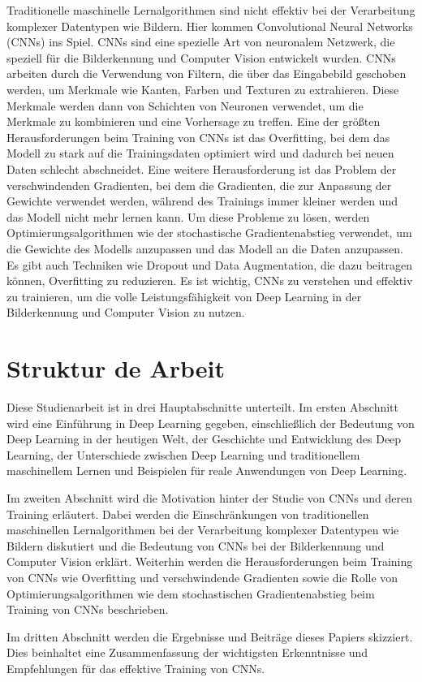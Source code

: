     Traditionelle maschinelle Lernalgorithmen sind nicht effektiv bei der Verarbeitung komplexer Datentypen wie Bildern. Hier kommen Convolutional Neural Networks (CNNs) ins Spiel. 
    CNNs sind eine spezielle Art von neuronalem Netzwerk, die speziell für die Bilderkennung und Computer Vision entwickelt wurden. 
    CNNs arbeiten durch die Verwendung von Filtern, die über das Eingabebild geschoben werden, um Merkmale wie Kanten, Farben und Texturen zu extrahieren. 
    Diese Merkmale werden dann von Schichten von Neuronen verwendet, um die Merkmale zu kombinieren und eine Vorhersage zu treffen. 
    Eine der größten Herausforderungen beim Training von CNNs ist das Overfitting, bei dem das Modell zu stark auf die Trainingsdaten optimiert wird und dadurch bei neuen Daten schlecht abschneidet. 
    Eine weitere Herausforderung ist das Problem der verschwindenden Gradienten, bei dem die Gradienten, die zur Anpassung der Gewichte verwendet werden, während des Trainings immer kleiner werden und das Modell nicht mehr lernen kann. 
    Um diese Probleme zu lösen, werden Optimierungsalgorithmen wie der stochastische Gradientenabstieg verwendet, um die Gewichte des Modells anzupassen und das Modell an die Daten anzupassen. 
    Es gibt auch Techniken wie Dropout und Data Augmentation, die dazu beitragen können, Overfitting zu reduzieren. 
    Es ist wichtig, CNNs zu verstehen und effektiv zu trainieren, um die volle Leistungsfähigkeit von Deep Learning in der Bilderkennung und Computer Vision zu nutzen. 
    
\section{Struktur de Arbeit}

Diese Studienarbeit ist in drei Hauptabschnitte unterteilt.
Im ersten Abschnitt wird eine Einführung in Deep Learning gegeben, einschließlich der Bedeutung von Deep Learning in der heutigen Welt, der Geschichte und Entwicklung des Deep Learning, der Unterschiede zwischen Deep Learning und traditionellem maschinellem Lernen und Beispielen für reale Anwendungen von Deep Learning.

Im zweiten Abschnitt wird die Motivation hinter der Studie von CNNs und deren Training erläutert. Dabei werden die Einschränkungen von traditionellen maschinellen Lernalgorithmen bei der Verarbeitung komplexer Datentypen wie Bildern diskutiert und die Bedeutung von CNNs bei der Bilderkennung und Computer Vision erklärt. Weiterhin werden die Herausforderungen beim Training von CNNs wie Overfitting und verschwindende Gradienten sowie die Rolle von Optimierungsalgorithmen wie dem stochastischen Gradientenabstieg beim Training von CNNs beschrieben.

Im dritten Abschnitt werden die Ergebnisse und Beiträge dieses Papiers skizziert. Dies beinhaltet eine Zusammenfassung der wichtigsten Erkenntnisse und Empfehlungen für das effektive Training von CNNs.